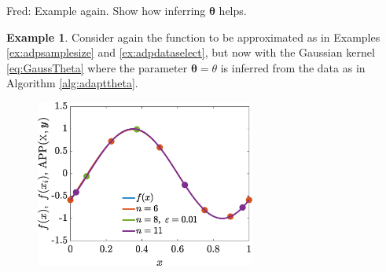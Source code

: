 \documentclass[]{mcom-l}
\theoremstyle{plain}
\theoremstyle{definition}
\newtheorem{example}{Example}
\newcommand{\btheta}{{\boldsymbol{\theta}}}
\newcommand{\FredNote}[1]{{\color{blue}Fred: #1}}
\begin{document}
\FredNote{Example again. Show how inferring $\btheta$ helps.}

\begin{example}
	\label{ex:adpdatachooseth}
	Consider again the function to be approximated as in Examples \ref{ex:adpsamplesize} and \ref{ex:adpdataselect}, but now with the Gaussian kernel \eqref{eq:GaussTheta} where the parameter $\btheta = \theta$ is inferred from the data as in Algorithm \ref{alg:adapttheta}.
		
	
	
	
	\begin{figure}[H]
		\centering
		\includegraphics[height = 5.5cm]{ProgramsImages/AdaptAlgo3_sinFun_GaussKernel_adapt_th_EmpBayesAx_theta_1.eps}
		\caption{ \label{fig:ex3}}
	\end{figure}
	
\end{example}
\end{document}
